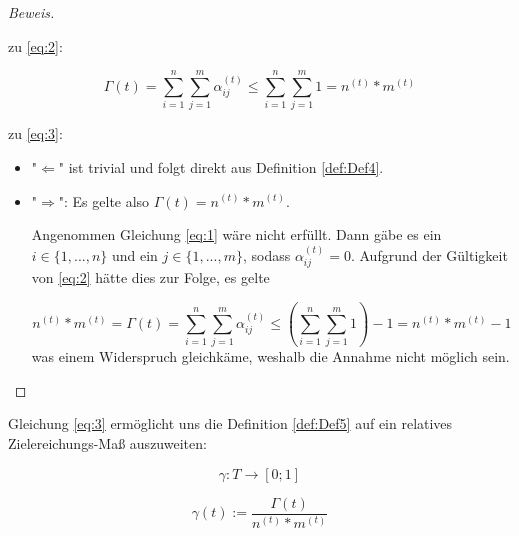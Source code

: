 \documentclass[11pt]{scrartcl}
\begin{document}
\begin{proof}[Beweis] \textrm{ }

\vspace{0.3cm}

  zu \eqref{eq:2}: 
  
\begin{equation*}
  \Gamma(t) = \sum_{i=1}^n \sum_{j=1}^m \alpha^{(t)}_{ij} \leq \sum_{i=1}^n \sum_{j=1}^m 1 = n^{(t)} * m^{(t)}
\end{equation*}

\vspace{0.3cm} 

zu \eqref{eq:3}: 

\begin{itemize}
  \item "$\Leftarrow$" ist trivial und folgt direkt aus Definition \ref{def:Def4}.
  \item "$\Rightarrow$": Es gelte also $\Gamma(t) = n^{(t)} * m^{(t)}$.
  
  Angenommen Gleichung \eqref{eq:1} wäre nicht erfüllt. Dann gäbe es ein $i \in \{1,...,n\}$ und ein $j \in \{1,...,m\}$, sodass $\alpha^{(t)}_{ij} = 0$. Aufgrund der Gültigkeit von \eqref{eq:2} hätte dies zur Folge, es gelte
  
\begin{equation*}
  n^{(t)} * m^{(t)} = \Gamma(t) = \sum_{i=1}^n \sum_{j=1}^m \alpha^{(t)}_{ij} \leq (\sum_{i=1}^n \sum_{j=1}^m 1) - 1 = n^{(t)} * m^{(t)} - 1
\end{equation*}  
was einem Widerspruch gleichkäme, weshalb die Annahme nicht möglich sein.
  
\end{itemize}
  
\end{proof}

\vspace{0.3cm}

Gleichung \eqref{eq:3} ermöglicht uns die Definition \ref{def:Def5} auf ein relatives Zielereichungs-Maß auszuweiten:

\vspace{0.3cm}

\begin{Def}\label{def:Def6}
\begin{equation*}
  \gamma : T \rightarrow [0; 1] 
\end{equation*}

\begin{equation*}
  \gamma(t):= \frac{\Gamma(t)}{n^{(t)} * m^{(t)}}
\end{equation*}

\end{Def}
\end{document}
